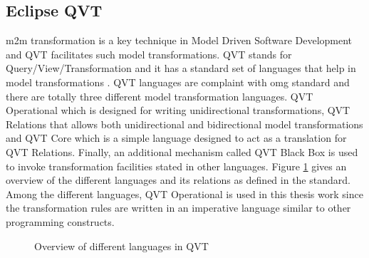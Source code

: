 \subsection{Eclipse QVT}
\gls{m2m} transformation is a key technique in Model Driven Software Development and QVT facilitates such model transformations. QVT stands for Query/View/Transformation and it has a standard set of languages that help in model transformations \cite{eclipseqvt}. QVT languages are complaint with \gls{omg} standard and there are totally three different model transformation languages. QVT Operational which is designed for writing unidirectional transformations, QVT Relations that allows both unidirectional and bidirectional model transformations and QVT Core which is a simple language designed to act as a translation for QVT Relations. Finally, an additional mechanism called QVT Black Box is used to invoke transformation facilities stated in other languages. Figure \ref{fig:overview} gives an overview of the different languages and its relations as defined in the standard. Among the different languages, QVT Operational is used in this thesis work since the transformation rules are written in an imperative language similar to other programming constructs. 

\begin{figure}[htb!]
\centering
{}
\caption{Overview of different languages in QVT \cite{eclipseqvt}}
\label{fig:overview}
\end{figure}

